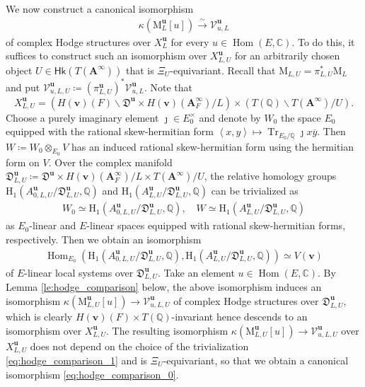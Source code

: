 \documentclass[12pt]{amsart}
\numberwithin{equation}{section}
\theoremstyle{plain}
\theoremstyle{definition}
\theoremstyle{remark}
\renewcommand{\b}[1]{\mathbf{#1}}
\renewcommand{\c}[1]{\mathcal{#1}}
\renewcommand{\d}[1]{\mathbb{#1}}
\newcommand{\f}[1]{\mathfrak{#1}}
\renewcommand{\r}[1]{\mathrm{#1}}
\renewcommand{\sf}[1]{\mathsf{#1}}
\renewcommand{\(}{\left(}
\renewcommand{\)}{\right)}
\newcommand{\bA}{\b A}
\newcommand{\cV}{\c V}
\newcommand{\dC}{\d C}
\newcommand{\dQ}{\d Q}
\newcommand{\fD}{\f D}
\newcommand{\rH}{\r H}
\newcommand{\rM}{\r M}
\newcommand{\bbu}{\boldsymbol{u}}
\newcommand{\bbv}{\boldsymbol{v}}
\newcommand{\llangle}{\left\langle}
\newcommand{\rrangle}{\right\rangle}
\newcommand{\Hk}{\sf{Hk}}
\DeclareMathOperator{\Hom}{Hom}
\DeclareMathOperator{\Tr}{Tr}
\begin{document}
We now construct a canonical isomorphism
\begin{align}\label{eq:hodge_comparison_0}
\kappa\(\rM_L^{\bbu}[u]\)\xrightarrow\sim\cV^{\bbu}_{u,L}
\end{align}
of complex Hodge structures over $X_L^{\bbu}$ for every $u\in\Hom(E,\dC)$. To do this, it suffices to construct such an isomorphism over $X_{L,U}^{\bbu}$ for an arbitrarily chosen object $U\in\Hk(T(\bA^\infty))$ that is $\Xi_U$-equivariant. Recall that $\rM_{L,U}=\pi_{L,U}^*\rM_L$ and put $\cV^{\bbu}_{u,L,U}\coloneqq(\pi_{L,U}^{\bbu})^*\cV^{\bbu}_{u,L}$. Note that
\[
X_{L,U}^{\bbu}=\(H(\bbv)(F)\backslash\fD^{\bbu}\times H(\bbv)(\bA_F^\infty)/L\)\times\(T(\dQ)\backslash T(\bA^\infty)/U\).
\]
Choose a purely imaginary element $\jmath\in E_0^\times$ and denote by $W_0$ the space $E_0$ equipped with the rational skew-hermitian form $\llangle x,y\rrangle\mapsto\Tr_{E_0/\dQ} \jmath x\overline{y}$. Then $W\coloneqq W_0\otimes_{E_0}V$ has an induced rational skew-hermitian form using the hermitian form on $V$. Over the complex manifold $\fD^{\bbu}_{L,U}\coloneqq\fD^{\bbu}\times H(\bbv)(\bA_F^\infty)/L\times T(\bA^\infty)/U$, the relative homology groups $\rH_1(A_{0,L,U}^{\bbu}/\fD_{L,U}^{\bbu},\dQ)$ and $\rH_1(A_{L,U}^{\bbu}/\fD_{L,U}^{\bbu},\dQ)$ can be trivialized as
\begin{align}\label{eq:hodge_comparison_1}
W_0\simeq\rH_1(A_{0,L,U}^{\bbu}/\fD_{L,U}^{\bbu},\dQ),\quad
W\simeq\rH_1(A_{L,U}^{\bbu}/\fD_{L,U}^{\bbu},\dQ)
\end{align}
as $E_0$-linear and $E$-linear spaces equipped with rational skew-hermitian forms, respectively. Then we obtain an isomorphism
\begin{align}\label{eq:hodge_comparison_2}
\Hom_{E_0}\(\rH_1(A_{0,L,U}^{\bbu}/\fD_{L,U}^{\bbu},\dQ),\rH_1(A_{L,U}^{\bbu}/\fD_{L,U}^{\bbu},\dQ)\)\simeq V(\bbv)
\end{align}
of $E$-linear local systems over $\fD^{\bbu}_{L,U}$. Take an element $u\in\Hom(E,\dC)$. By Lemma \ref{le:hodge_comparison} below, the above isomorphism induces an isomorphism $\kappa\(\rM_{L,U}^{\bbu}[u]\)\to\cV^{\bbu}_{u,L,U}$ of complex Hodge structures over $\fD^{\bbu}_{L,U}$, which is clearly $H(\bbv)(F)\times T(\dQ)$-invariant hence descends to an isomorphism over $X_{L,U}^{\bbu}$. The resulting isomorphism $\kappa\(\rM_{L,U}^{\bbu}[u]\)\to\cV^{\bbu}_{u,L,U}$ over $X_{L,U}^{\bbu}$ does not depend on the choice of the trivialization \eqref{eq:hodge_comparison_1} and is $\Xi_U$-equivariant, so that we obtain a canonical isomorphism \eqref{eq:hodge_comparison_0}.
\end{document}
